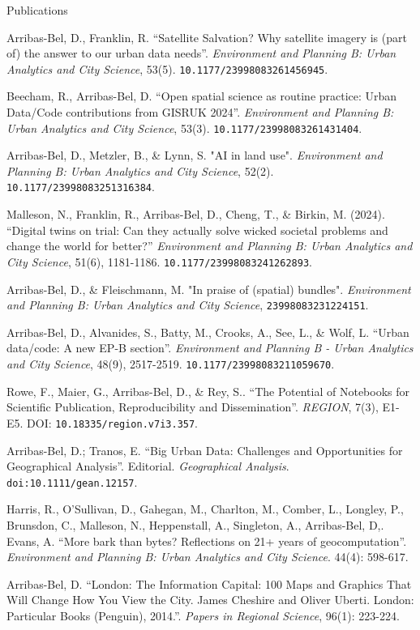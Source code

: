 \documentclass[12pt,2up]{article}
\begin{document}
\begin{cv}{}
\begin{cvlist}{Publications}
\item[\textbf{Other academic articles}]
\item[\textit{2026}] Arribas-Bel, D., Franklin, R. ``Satellite Salvation? Why
        satellite imagery is (part of) the answer to our urban data needs''.
  \emph{Environment and Planning B: Urban Analytics and City Science}, 53(5).
  \texttt{10.1177/23998083261456945}.
\item[\textit{2026}] Beecham, R., Arribas-Bel, D. ``Open spatial science as
        routine practice: Urban Data/Code contributions from GISRUK 2024''.
  \emph{Environment and Planning B: Urban Analytics and City Science}, 53(3).
  \texttt{10.1177/23998083261431404}.
\item[\textit{2025}] Arribas-Bel, D., Metzler, B., \& Lynn, S. "AI in land use".
  \emph{Environment and Planning B: Urban Analytics and City Science}, 52(2).
  \texttt{10.1177/23998083251316384}.
\item[\textit{2024}] Malleson, N., Franklin, R., Arribas-Bel, D., Cheng, T., \& Birkin, M. (2024). 
  ``Digital twins on trial: Can they actually solve wicked societal problems and 
  change the world for better?'' 
  \emph{Environment and Planning B: Urban Analytics and City Science}, 51(6), 1181-1186.
  \texttt{10.1177/23998083241262893}.
\item[] Arribas-Bel, D., \& Fleischmann, M. "In praise of (spatial) bundles".
    \emph{Environment and Planning B: Urban Analytics and City Science},
    \texttt{23998083231224151}.
\item[\textit{2021}] Arribas-Bel, D., Alvanides, S., Batty, M., Crooks, A., See, L., \&
    Wolf, L. ``Urban data/code: A new EP-B section''. \emph{Environment and
    Planning B - Urban Analytics and City Science}, 48(9), 2517-2519.
    \texttt{10.1177/23998083211059670}.
\item[2020] Rowe, F., Maier, G., Arribas-Bel, D., \& Rey, S.. ``The Potential of
    Notebooks for Scientific Publication, Reproducibility and Dissemination''.
    \emph{REGION}, 7(3), E1-E5. DOI: \texttt{10.18335/region.v7i3.357}.
\item[\textit{2018}] 
    Arribas-Bel, D.; Tranos, E. ``Big Urban Data: Challenges and Opportunities
    for Geographical Analysis''. Editorial. \emph{Geographical Analysis}.
    \texttt{doi:10.1111/gean.12157}.
\item[\textit{2017}] Harris, R., O'Sullivan, D., Gahegan, M., Charlton, M.,
    Comber, L., Longley, P., Brunsdon, C., Malleson, N., Heppenstall, A.,
    Singleton, A., Arribas-Bel, D,. Evans, A. ``More bark than bytes?
    Reflections on 21+ years of geocomputation''. \emph{Environment and
    Planning B: Urban Analytics and City Science}. 44(4): 598-617.
\item[2016] Arribas-Bel, D. ``London: The Information Capital: 100 Maps and Graphics That Will Change How You View the City. James Cheshire and Oliver Uberti. London: Particular Books (Penguin), 2014.''.
    \emph{Papers in Regional Science}, 96(1): 223-224.


\end{cvlist}
\end{cv}
\end{document}
